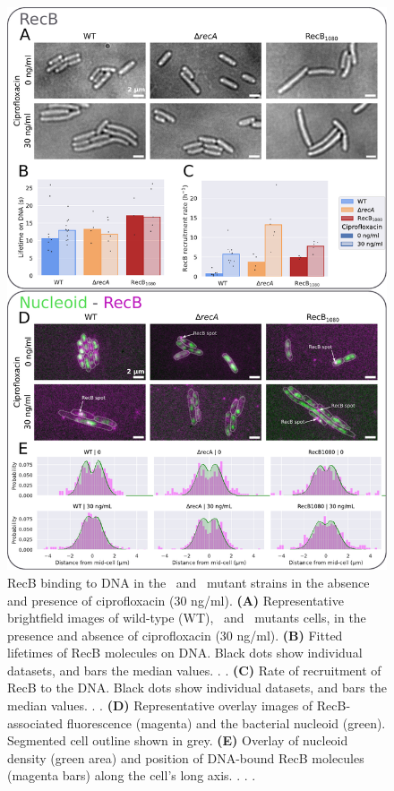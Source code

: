\begin{figure}[htbp]
    \centering
    \includegraphics[width=.75\textwidth]{Figures/Fig4_mutants.pdf}
    \caption{RecB binding to DNA in the \dreca\ and \geneteneighty\ mutant strains in the absence and presence of ciprofloxacin (30 ng/ml). \textbf{(A)} Representative brightfield images of wild-type (WT), \dreca\ and \geneteneighty\ mutants cells, in the presence and absence of ciprofloxacin (30 ng/ml). \textbf{(B)} Fitted lifetimes of RecB molecules on DNA. Black dots show individual datasets, and bars the median values. . . \textbf{(C)} Rate of recruitment of RecB to the DNA. Black dots show individual datasets, and bars the median values. . . \textbf{(D)} Representative overlay images of RecB-associated fluorescence (magenta) and the bacterial nucleoid (green). Segmented cell outline shown in grey. \textbf{(E)} Overlay of nucleoid density (green area) and position of DNA-bound RecB molecules (magenta bars) along the cell's long axis. . . .}
    \label{Fig:mutants}
\end{figure}
